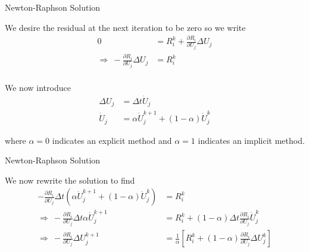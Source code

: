 \documentclass[11pt]{beamer}
\begin{document}
%
%
%

\begin{frame}{Newton-Raphson Solution}

We desire the residual at the next iteration to be zero so we write
\begin{equation}
\begin{aligned}
0 &= R_i^k + \frac{\partial R_i}{\partial U_j} \Delta U_j\\
\Rightarrow\ -\frac{\partial R_i}{\partial U_j} \Delta U_j &= R_i^k\\
\end{aligned}
\end{equation}

We now introduce
\begin{align*}
\Delta U_j &= \Delta t \dot{U}_j\\
\dot{U}_j &= \alpha \dot{U}_j^{k+1} + \left(1-\alpha\right) \dot{U}_j^{k}
\end{align*}

where $\alpha = 0$ indicates an explicit method and $\alpha = 1$ indicates an implicit method.

\end{frame}

\begin{frame}{Newton-Raphson Solution}

We now rewrite the solution to find
\begin{equation}
\begin{aligned}
-\frac{\partial R_i}{\partial U_j} \Delta t \left(\alpha \dot{U}_j^{k+1} + \left(1-\alpha\right) \dot{U}_j^{k}\right) &= R_i^k\\
\Rightarrow\ -\frac{\partial R_i}{\partial U_j} \Delta t \alpha \dot{U}_j^{k+1} &= R_i^k + \left(1-\alpha\right) \Delta t \frac{\partial R_i}{\partial U_j} \dot{U}_j^k\\
\Rightarrow\ - \frac{\partial R_i}{\partial U_j} \Delta U_j^{k+1} &= \frac{1}{\alpha} \left[R_i^k + \left(1-\alpha\right) \frac{\partial R_i}{\partial U_j} \Delta U_j^k\right]\\
\end{aligned}
\end{equation}

\end{frame}
\end{document}
